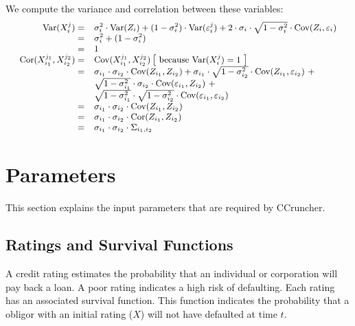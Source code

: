 \documentclass[a4paper,12pt,final]{article}
\begin{document}
We compute the variance and correlation between these variables:
\begin{displaymath}
\small
\begin{array}{rl}
\textrm{Var}(X_i^j) = & 
\sigma_i^2 \cdot \textrm{Var}(Z_i) + 
(1-\sigma_i^2) \cdot \textrm{Var}(\varepsilon_i^j) + 
2 \cdot \sigma_i \cdot \sqrt{1-\sigma_i^2} \cdot \textrm{Cov}(Z_i,\varepsilon_i) \\
= & \sigma_i^2 + (1-\sigma_i^2) \\
= & 1 \\
\textrm{Cor}(X_{i_1}^{j_1},X_{i_2}^{j_2}) = & \textrm{Cov}(X_{i_1}^{j_1},X_{i_2}^{j_2})
\left[ \textrm{ because Var}(X_i^j) = 1 \ \right] \\
= & 
\sigma_{i_1} \cdot \sigma_{i_2} \cdot \textrm{Cov}(Z_{i_1},Z_{i_2}) +
\sigma_{i_1} \cdot \sqrt{1-\sigma_{i_2}^2} \cdot \textrm{Cov}(Z_{i_1},\varepsilon_{i_2})\ + \\
& \sqrt{1-\sigma_{i_1}^2} \cdot \sigma_{i_2} \cdot \textrm{Cov}(\varepsilon_{i_1},Z_{i_2})\ + \\
& \sqrt{1-\sigma_{i_1}^2} \cdot \sqrt{1-\sigma_{i_2}^2} \cdot \textrm{Cov}(\varepsilon_{i_1},\varepsilon_{i_2}) \\
= & \sigma_{i_1} \cdot \sigma_{i_2} \cdot \textrm{Cov}(Z_{i_1},Z_{i_2}) \\
= & \sigma_{i_1} \cdot \sigma_{i_2} \cdot \textrm{Cor}(Z_{i_1},Z_{i_2}) \\
= & \sigma_{i_1} \cdot \sigma_{i_2} \cdot \Sigma_{i_1,i_2}
\end{array}
\end{displaymath}


\section{Parameters}

This section explains the input parameters that are required by CCruncher.

\subsection{Ratings and Survival Functions}
A credit rating estimates the probability that an individual or corporation 
will pay back a loan. A poor rating indicates a high risk of defaulting.
Each rating has an associated survival function. This function indicates 
the probability that a obligor with an initial rating ($X$) will not have 
defaulted at time $t$. 
\end{document}

